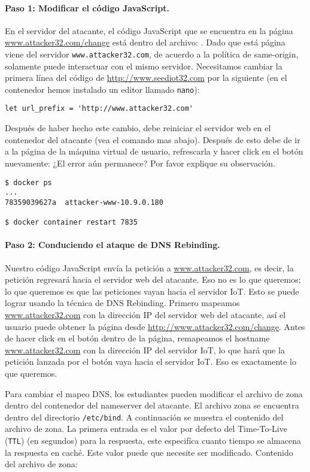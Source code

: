 \paragraph{Paso 1: Modificar el código JavaScript.}
En el servidor del atacante, el código JavaScript que se encuentra en la página \url{www.attacker32.com/change} está dentro del archivo: . Dado que está página viene del servidor  \texttt{www.attacker32.com}, de acuerdo a la política de same-origin, solamente puede interactuar con el mismo servidor. Necesitamos cambiar la primera línea del código de  \url{http://www.seediot32.com} por la siguiente (en el contenedor hemos instalado un editor llamado \texttt{nano}):

\begin{lstlisting}
let url_prefix = 'http://www.attacker32.com'
\end{lstlisting}
 
Después de haber hecho este cambio, debe reiniciar el servidor web en el contenedor del atacante (vea el comando mas abajo). Después de esto debe de ir a la página de la máquina virtual de usuario, refrescarla y hacer click en el botón nuevamente: ¿El error aún permanece? Por favor explique su observación.


\begin{lstlisting}
$ docker ps
...
78359039627a  attacker-www-10.9.0.180

$ docker container restart 7835
\end{lstlisting}
 

\paragraph{Paso 2: Conduciendo el ataque de DNS Rebinding.}
Nuestro código JavaScript envía la petición a  \url{www.attacker32.com},  es decir, la petición regresará hacia el servidor web del atacante. Eso no es lo que queremos; lo que queremos es que las peticiones vayan hacia el servidor IoT.
Esto se puede lograr usando la técnica de DNS Rebinding. Primero mapeamos  \url{www.attacker32.com} con la dirección IP del servidor web del atacante, así el usuario puede obtener la página desde \url{http://www.attacker32.com/change}. Antes de hacer click en el botón dentro de la página, remapeamos el hostname \url{www.attacker32.com} con la dirección IP del servidor IoT, lo que hará que la petición lanzada por el botón vaya hacia el servidor IoT. Eso es exactamente lo que queremos.

Para cambiar el mapeo DNS, los estudiantes pueden modificar el archivo de zona  dentro del contenedor del nameserver del atacante.
El archivo zona se encuentra dentro del directorio \texttt{/etc/bind}.
A continuación se muestra el contenido del archivo de zona. La primera entrada es el valor por defecto del Time-To-Live (\texttt{TTL}) (en segundos) para la respuesta, este especifíca cuanto tiempo se almacena la respuesta en caché. Este valor puede que necesite ser modificado.
Contenido del archivo de zona:

